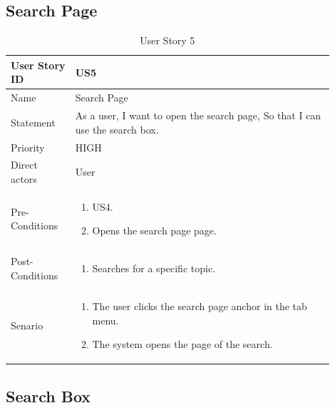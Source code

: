 \documentclass{scrartcl}
\begin{document}
\subsection{Search Page}

\begin{table}[H]
  \caption{User Story 5}
  \begin{tabular}{p{0.18\linewidth} | p{0.72\linewidth}}
    \toprule
    User Story ID & US5
    \\\midrule
    Name & Search Page
    \\\hline
    Statement & As a user, I want to open the search page, So that I can use the search box.
    \\\hline
    Priority & HIGH
    \\\hline
    Direct actors & User
    \\\hline
    Pre-Conditions & {
                     \begin{enumerate}
                     \item US4.
                     \item Opens the search page page.
                     \end{enumerate}
                     }\vspace*{-\baselineskip}
    \\\hline
    Post-Conditions & {
                      \begin{enumerate}
                      \item Searches for a specific topic.
                      \end{enumerate}
                      }\vspace*{-\baselineskip}
    \\\hline
    Senario & {
              \begin{enumerate}
              \item The user clicks the search page anchor in the tab menu.
              \item The system opens the page of the search.
              \end{enumerate}
              }\vspace*{-\baselineskip}
    \\\bottomrule
  \end{tabular}
\end{table}

\subsection{Search Box}
\end{document}
